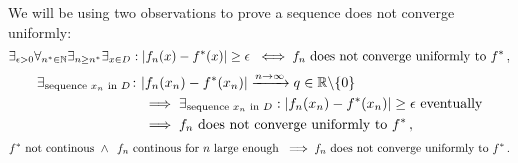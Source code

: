 \documentclass[week=5]{homework}
\begin{document}
\begin{questions}
		We will be using two observations to prove a sequence does not converge uniformly:
		\begin{equation} \label{Q4:notunif:def}
			\exists_{\epsilon > 0}\forall_{n^* \in \naturals}\exists_{n \geq n^*}\exists_{x \in D}: |f_n(x) - f^*(x)| \geq \epsilon\ \iff  f_n \text{ does not converge uniformly to } f^*\,,
		\end{equation}
		\begin{align}\label{Q4:notunif:seq}
		\begin{split}
		\exists_{\text{sequence } x_n \text{ in } D}\colon &|f_n(x_n) - f^*(x_n)| \xrightarrow{n\to\infty} q \in \reals\backslash\{0\} \\
		&\implies \exists_{\text{sequence } x_n \text{ in } D}: |f_n(x_n) - f^*(x_n)| \geq \epsilon \text{ eventually} \\ 
		&\implies f_n \text{ does not converge uniformly to } f^*\,,
		\end{split}
		\end{align}
		\begin{equation} \label{Q4:notunif:cont}
		f^* \text{ not continous } \wedge \enskip f_n \text{ continous for }n\text{ large enough } \implies f_n \text{ does not converge uniformly to } f^*\,.
		\end{equation}
		
\end{questions}
\end{document}
